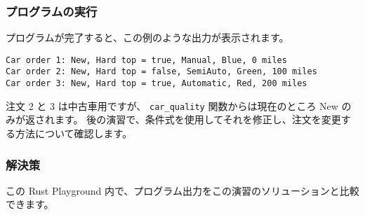 \subsubsection{プログラムの実行}

プログラムが完了すると、この例のような出力が表示されます。

\begin{lstlisting}[numbers=none]
Car order 1: New, Hard top = true, Manual, Blue, 0 miles
Car order 2: New, Hard top = false, SemiAuto, Green, 100 miles
Car order 3: New, Hard top = true, Automatic, Red, 200 miles
\end{lstlisting}

注文 2 と 3 は中古車用ですが、 \texttt{car\_quality} 関数からは現在のところ New のみが返されます。 後の演習で、条件式を使用してそれを修正し、注文を変更する方法について確認します。


\subsubsection{解決策}

この Rust Playground 内で、プログラム出力をこの演習のソリューションと比較できます。

